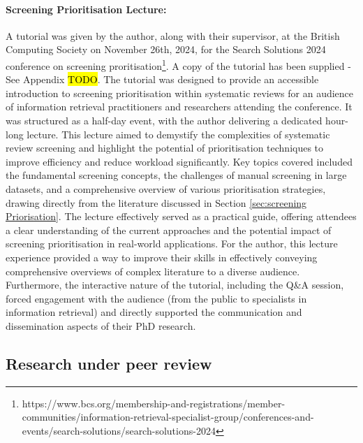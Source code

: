 \documentclass[10pt,oneside]{book}
\begin{document}
\paragraph{Screening Prioritisation Lecture: } A tutorial was given by the author, along with their supervisor, at the British Computing Society on November 26th, 2024, for the Search Solutions 2024 conference on screening proritisation\footnote{https://www.bcs.org/membership-and-registrations/member-communities/information-retrieval-specialist-group/conferences-and-events/search-solutions/search-solutions-2024}. A copy of the tutorial has been supplied - See Appendix \hl{TODO}. The tutorial was designed to provide an accessible introduction to screening prioritisation within systematic reviews for an audience of information retrieval practitioners and researchers attending the conference. It was structured as a half-day event, with the author delivering a dedicated hour-long lecture. This lecture aimed to demystify the complexities of systematic review screening and highlight the potential of prioritisation techniques to improve efficiency and reduce workload significantly. Key topics covered included the fundamental screening concepts, the challenges of manual screening in large datasets, and a comprehensive overview of various prioritisation strategies, drawing directly from the literature discussed in Section \ref{sec:screening Priorisation}. The lecture effectively served as a practical guide, offering attendees a clear understanding of the current approaches and the potential impact of screening prioritisation in real-world applications. For the author, this lecture experience provided a way to improve their skills in effectively conveying comprehensive overviews of complex literature to a diverse audience. Furthermore, the interactive nature of the tutorial, including the Q\&A session, forced engagement with the audience (from the public to specialists in information retrieval) and directly supported the communication and dissemination aspects of their PhD research.

\subsection{Research under peer review}
\end{document}
